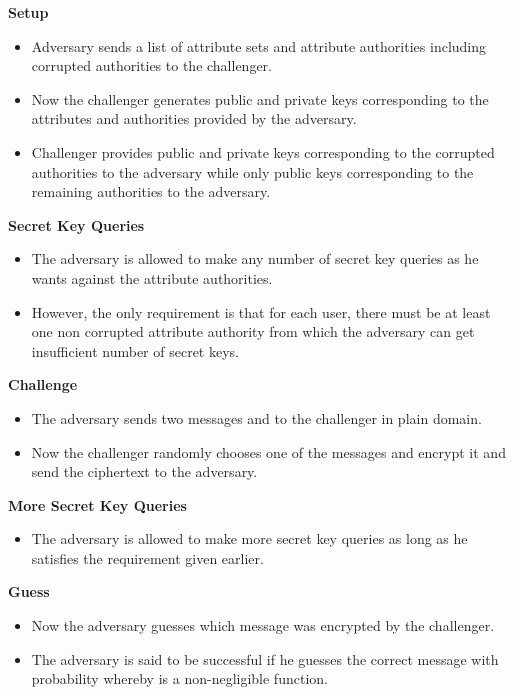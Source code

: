 \documentclass[10pt,journal]{IEEEtran}
\begin{document}
\noindent\textbf{Setup}
\begin{itemize}
  \item Adversary sends a list of attribute sets and attribute authorities including corrupted authorities to the challenger.
  \item Now the challenger generates public and private keys corresponding to the attributes and authorities provided by the adversary.
  \item Challenger provides public and private keys corresponding to the corrupted authorities to the adversary while only public keys corresponding to the remaining authorities to the adversary.
\end{itemize}
\noindent\textbf{Secret Key Queries}
\begin{itemize}
  \item The adversary is allowed to make any number of secret key queries as he wants against the attribute authorities.
  \item However, the only requirement is that for each user, there must be at least one non corrupted attribute  authority from which the adversary can get insufficient number of secret keys.
\end{itemize}
\noindent\textbf{Challenge}
\begin{itemize}
  \item The adversary sends two messages  and  to the challenger in plain domain.
  \item Now the challenger randomly chooses one of the messages and encrypt it and send the ciphertext to the adversary.
\end{itemize}
\noindent\textbf{More Secret Key Queries}
\begin{itemize}
  \item The adversary is allowed to make more secret key queries as long as he satisfies the requirement  given earlier.
\end{itemize}
\noindent\textbf{Guess}
\begin{itemize}
  \item Now the adversary guesses which message was encrypted by the challenger.
  \item The adversary is said to be successful if he guesses the correct message with probability  whereby  is a non-negligible function.
\end{itemize}
\end{document}
